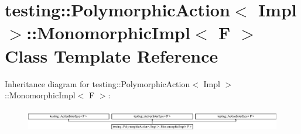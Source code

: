 \hypertarget{classtesting_1_1_polymorphic_action_1_1_monomorphic_impl}{}\section{testing\+::Polymorphic\+Action$<$ Impl $>$\+::Monomorphic\+Impl$<$ F $>$ Class Template Reference}
\label{classtesting_1_1_polymorphic_action_1_1_monomorphic_impl}
Inheritance diagram for testing\+::Polymorphic\+Action$<$ Impl $>$\+::Monomorphic\+Impl$<$ F $>$\+:\begin{figure}[H]
\begin{center}
\leavevmode
\includegraphics[height=1.063628cm]{dc/d47/classtesting_1_1_polymorphic_action_1_1_monomorphic_impl}
\end{center}
\end{figure}
